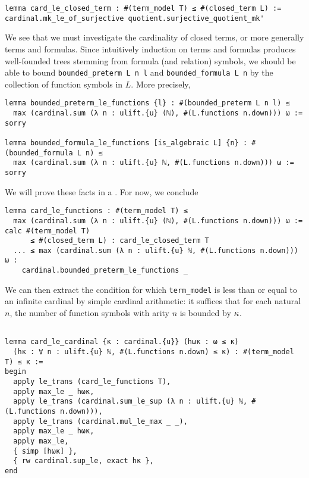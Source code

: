 \begin{lstlisting}
lemma card_le_closed_term : #(term_model T) ≤ #(closed_term L) :=
cardinal.mk_le_of_surjective quotient.surjective_quotient_mk' \end{lstlisting}

We see that we must investigate the cardinality of
closed terms, or more generally terms and formulas.
Since intuitively induction on terms and formulas
produces well-founded trees stemming from formula (and relation) symbols,
we should be able to bound \texttt{bounded\_preterm L n l}
and \texttt{bounded\_formula L n} by the collection of function symbols in $L$.
More precisely,
\begin{lstlisting}
lemma bounded_preterm_le_functions {l} : #(bounded_preterm L n l) ≤
  max (cardinal.sum (λ n : ulift.{u} (ℕ), #(L.functions n.down))) ω := sorry

lemma bounded_formula_le_functions [is_algebraic L] {n} : #(bounded_formula L n) ≤
  max (cardinal.sum (λ n : ulift.{u} ℕ, #(L.functions n.down))) ω := sorry \end{lstlisting}

We will prove these facts in a .
For now, we conclude

\begin{lstlisting}
lemma card_le_functions : #(term_model T) ≤
  max (cardinal.sum (λ n : ulift.{u} (ℕ), #(L.functions n.down))) ω :=
calc #(term_model T)
      ≤ #(closed_term L) : card_le_closed_term T
  ... ≤ max (cardinal.sum (λ n : ulift.{u} ℕ, #(L.functions n.down))) ω :
    cardinal.bounded_preterm_le_functions _ \end{lstlisting}

We can then extract the condition for which \texttt{term\_model} is
less than or equal to an infinite cardinal by simple cardinal
arithmetic: it suffices that for each natural $n$,
the number of function symbols with arity $n$ is bounded by $\kappa$.

\begin{lstlisting}

lemma card_le_cardinal {κ : cardinal.{u}} (hωκ : ω ≤ κ)
  (hκ : ∀ n : ulift.{u} ℕ, #(L.functions n.down) ≤ κ) : #(term_model T) ≤ κ :=
begin
  apply le_trans (card_le_functions T),
  apply max_le _ hωκ,
  apply le_trans (cardinal.sum_le_sup (λ n : ulift.{u} ℕ, #(L.functions n.down))),
  apply le_trans (cardinal.mul_le_max _ _),
  apply max_le _ hωκ,
  apply max_le,
  { simp [hωκ] },
  { rw cardinal.sup_le, exact hκ },
end \end{lstlisting}

